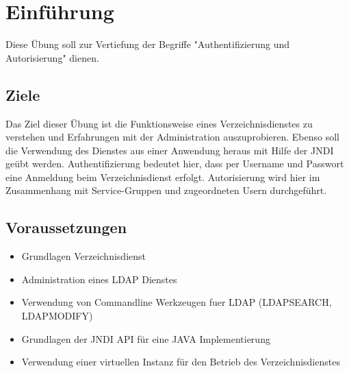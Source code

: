 \documentclass[letterpaper, 12pt]{article}
\let\tempsection\section
\renewcommand\section[1]{\vspace{-0.3cm}\tempsection{#1}\vspace{-0.3cm}}
\let\tempsubsection\subsection
\renewcommand\subsection[1]{\vspace{0cm}\tempsubsection{#1}\vspace{0cm}}
\begin{document}
\parindent 0pt
\parskip 6pt



\clearpage
\thispagestyle{empty}
\tableofcontents

\newpage
{}
\pagestyle{fancy}

\section{Einführung}
Diese Übung soll zur Vertiefung der Begriffe "Authentifizierung und Autorisierung" dienen.
\subsection{Ziele}
Das Ziel dieser Übung ist die Funktionsweise eines Verzeichnisdienstes zu verstehen und Erfahrungen mit der Administration auszuprobieren. Ebenso soll die Verwendung des Dienstes aus einer Anwendung heraus mit Hilfe der JNDI geübt werden. \newline
Authentifizierung bedeutet hier, dass per Username und Passwort eine Anmeldung beim Verzeichnisdienst erfolgt. Autorisierung wird hier im Zusammenhang mit Service-Gruppen und zugeordneten Usern durchgeführt.
\subsection{Voraussetzungen}
\begin{itemize}
	\item Grundlagen Verzeichnisdienst
	\item Administration eines LDAP Dienstes
	\item Verwendung von Commandline Werkzeugen fuer LDAP (LDAPSEARCH, LDAPMODIFY)
	\item Grundlagen der JNDI API für eine JAVA Implementierung
	\item Verwendung einer virtuellen Instanz für den Betrieb des Verzeichnisdienstes
\end{itemize}
\end{document}
